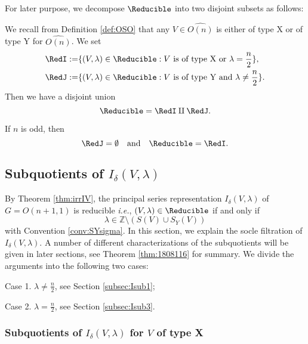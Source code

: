 For later purpose,
 we decompose $\Reducible$
 into two disjoint subsets as follows:
\begin{definition}
\label{def:Red12}
 We recall from Definition \ref{def:OSO}
 that any $V \in \widehat{O(n)}$ is either
 of type X or of type Y for
 $\widehat{O(n)}$.  
We set
\begin{align*}
\RedI
:=&\{(V, \lambda) \in \Reducible
:
\text{$V$ is of type X or $\lambda = \frac n 2$}
\}, 
\\
\RedJ
:=&\{(V, \lambda) \in \Reducible
:
\text{$V$ is of type Y and $\lambda \ne \frac n 2$}
\}.  
\end{align*}
Then we have a disjoint union 
\[
\Reducible=\RedI \amalg \RedJ.  
\]
\end{definition}

\begin{remark}
\label{rem:Red12}
If $n$ is odd,
 then 
\[
  \RedJ = \emptyset
  \quad
  \text{and}
  \quad
  \Reducible =\RedI.  
\]
\end{remark}

\subsection{Subquotients of $I_{\delta}(V,\lambda)$
\label{subsec:subrep}}
By Theorem \ref{thm:irrIV}, 
 the principal series representation $I_{\delta}(V,\lambda)$
 of $G=O(n+1,1)$ is reducible
 {\it{i.e.}}, $(V,\lambda) \in \Reducible$
 if and only if
\begin{equation*}
   \lambda \in {\mathbb{Z}} \setminus (S(V) \cup S_Y(V))
\end{equation*}
 with Convention \ref{conv:SYsigma}.  
In this section,
 we explain the socle filtration of $I_{\delta}(V,\lambda)$.  
A number of different characterizations of the subquotients 
 will be given in later sections,
 see Theorem \ref{thm:1808116}
 for summary.  
We divide the arguments into the following two cases:
\par\noindent
Case 1.\enspace
$\lambda \ne \frac n 2$, 
 see Section \ref{subsec:Isub1};
\par\noindent
Case 2.\enspace
$\lambda = \frac n 2$, 
 see Section \ref{subsec:Isub3}.  

\subsubsection{Subquotients of 
 $I_{\delta}(V,\lambda)$ for $V$ of type X
\label{subsec:Isub1}}



